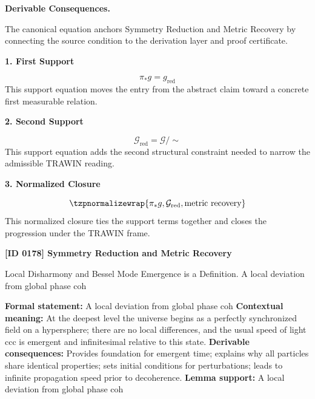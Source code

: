\par\vspace{0.35em}
\noindent\textbf{Derivable Consequences.}\quad
\begingroup
\footnotesize
\raggedright
The canonical equation anchors Symmetry Reduction and Metric Recovery by connecting the source condition to the derivation layer and proof certificate.
\par\endgroup

\noindent\textbf{1. First Support}\par
\[
\pi_* g = g_{\mathrm{red}}
\]
\noindent This support equation moves the entry from the abstract claim toward a concrete first measurable relation.\par
\noindent\textbf{2. Second Support}\par
\[
\mathcal{G}_{\mathrm{red}} = \mathcal{G}/\!\sim
\]
\noindent This support equation adds the second structural constraint needed to narrow the admissible TRAWIN reading.\par
\noindent\textbf{3. Normalized Closure}\par
\[
\tzpnormalizewrap{\pi_* g,\mathcal{G}_{\mathrm{red}},\text{metric recovery}}
\]
\noindent This normalized closure ties the support terms together and closes the progression under the TRAWIN frame.\par

\clearpage
\noindent\textbf{[ID 0178] Symmetry Reduction and Metric Recovery}\par
\vspace{0.35em}
\begingroup\small
{}
Local Disharmony and Bessel Mode Emergence is a Definition. A local deviation from global phase coh

\begingroup\footnotesize\setlength{\emergencystretch}{3em}\sloppy
\textbf{Formal statement:} A local deviation from global phase coh
\textbf{Contextual meaning:} At the deepest level the universe begins as a perfectly synchronized field on a hypersphere; there are no local differences, and the usual speed of light ccc is emergent and infinitesimal relative to this state.
\textbf{Derivable consequences:} Provides foundation for emergent time; explains why all particles share identical properties; sets initial conditions for perturbations; leads to infinite propagation speed prior to decoherence.  
\textbf{Lemma support:} A local deviation from global phase coh\par
\endgroup

